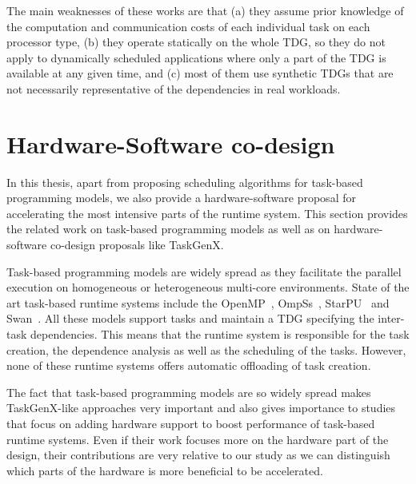 
The main weaknesses of these works are that (a) they assume prior knowledge of the computation and communication costs of each individual task on each processor type, (b) they operate statically on the whole TDG, so they do not apply to dynamically scheduled applications where only a part of the TDG is available at any given time, and (c) most of them use synthetic TDGs that are not necessarily representative of the dependencies in real workloads.




\section{Hardware-Software co-design}
\label{sec.related.taskgenx}


In this thesis, apart from proposing scheduling algorithms for task-based programming models, we also provide a hardware-software proposal for accelerating the most intensive parts of the runtime system.
This section provides the related work on task-based programming models as well as on hardware-software co-design proposals like TaskGenX.

Task-based programming models are widely spread as they facilitate the parallel execution on homogeneous or heterogeneous multi-core environments.
State of the art task-based runtime systems include the OpenMP~\cite{OpenMP}, OmpSs~\cite{OmpSs_PPL11}, StarPU~\cite{starpu} and Swan~\cite{Vandierendonck:PACT2011}.
All these models support tasks and maintain a TDG specifying the inter-task dependencies.
This means that the runtime system is responsible for the task creation, the dependence analysis as well as the scheduling of the tasks.
However, none of these runtime systems offers automatic offloading of task creation.

The fact that task-based programming models are so widely spread makes TaskGenX-like approaches very important and also gives importance to studies that focus on adding hardware support to boost performance of task-based runtime systems.
Even if their work focuses more on the hardware part of the design, their contributions are very relative to our study as we can distinguish which parts of the hardware is more beneficial to be accelerated.

